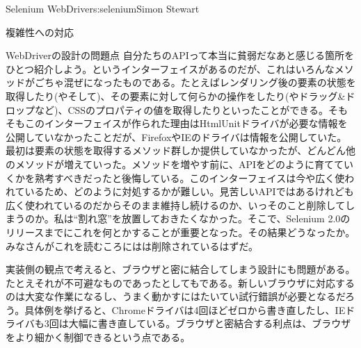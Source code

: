 \begin{aosachapter}{Selenium WebDriver}{s:selenium}{Simon Stewart}
\begin{aosasect1}{複雑性への対応}
\begin{aosasect2}{WebDriverの設計の問題点}
自分たちのAPIって本当に貧弱だなあと感じる箇所をひとつ紹介しよう。というインターフェイスがあるのだが、これはいろんなメソッドがごちゃ混ぜになったものである。たとえばレンダリング後の要素の状態を取得したり(やそして)、その要素に対して何らかの操作をしたり(やドラッグ\&ドロップなど)、CSSのプロパティの値を取得したりといったことができる。そもそもこのインターフェイスが作られた理由はHtmlUnitドライバが必要な情報を公開していなかったことだが、FirefoxやIEのドライバは情報を公開していた。最初は要素の状態を取得するメソッド群しか提供していなかったが、どんどん他のメソッドが増えていった。メソッドを増やす前に、APIをどのように育てていくかを熟考すべきだったと後悔している。このインターフェイスは今や広く使われているため、どのように対処するかが難しい。見苦しいAPIではあるけれども広く使われているのだからそのまま維持し続けるのか、いっそのこと削除してしまうのか。私は``割れ窓''を放置しておきたくなかった。そこで、Selenium 2.0のリリースまでにこれを何とかすることが重要となった。その結果どうなったか。みなさんがこれを読むころにはは削除されているはずだ。

実装側の観点で考えると、ブラウザと密に結合してしまう設計にも問題がある。たとえそれが不可避なものであったとしてもである。新しいブラウザに対応するのは大変な作業になるし、うまく動かすにはたいてい試行錯誤が必要となるだろう。具体例を挙げると、Chromeドライバは4回ほどゼロから書き直したし、IEドライバも3回は大幅に書き直している。ブラウザと密結合する利点は、ブラウザをより細かく制御できるという点である。


\end{aosasect2}
\end{aosasect1}
\end{aosachapter}
